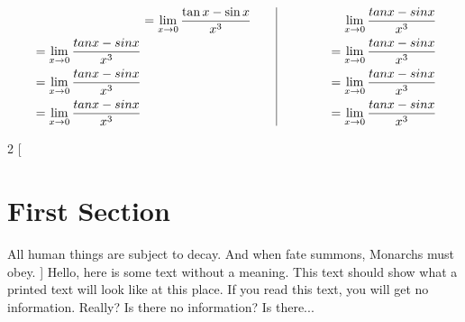 \documentclass[14pt]{extarticle}
\begin{document}
\begin{equation*}
\begin{aligned}[t]
&=\lim_{x \to 0} \frac{\tan{x} - \sin {x}}{x^3} \\
\ =\lim_{x \to 0} \frac{tan x - sin x}{x^3}\\ 
\ =\lim_{x \to 0} \frac{tan x - sin x}{x^3} \\
\ =\lim_{x \to 0} \frac{tan x - sin x}{x^3} 
\end{aligned}
\qquad 
\vrule
\qquad
\begin{aligned}[t]
\end{aligned}
\qquad
\begin{aligned}[t]
\lim_{x \to 0} \frac{tan x - sin x}{x^3} \\
\ =\lim_{x \to 0} \frac{tan x - sin x}{x^3}\\ 
\ =\lim_{x \to 0} \frac{tan x - sin x}{x^3} \\
\ =\lim_{x \to 0} \frac{tan x - sin x}{x^3} 
\end{aligned}
\end{equation*}

\begin{multicols}{2}
[
\section{First Section}
All human things are subject to decay. And when fate summons, Monarchs must obey.
]
Hello, here is some text without a meaning.  This text should show what 
a printed text will look like at this place.
If you read this text, you will get no information.  Really?  Is there 
no information?  Is there...
\end{multicols}
\end{document}
